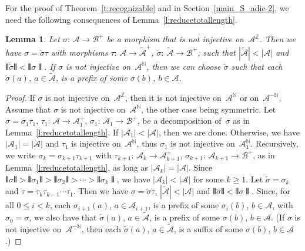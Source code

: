 \documentclass{amsart}
\newtheorem{lemma}{Lemma}[section]
\theoremstyle{definition}
\theoremstyle{remark}
\numberwithin{equation}{section}
\begin{document}
For the proof of Theorem~\ref{t:recognizable} and in Section~\ref{main_S_adic-2}, we need the following consequences of Lemma~\ref{l:reducetotallength}.

\begin{lemma} \label{l:reducealphabet}
Let $\sigma:\, \mathcal{A} \to \mathcal{B}^+$ be a morphism that is not injective on~$\mathcal{A}^\mathbb{Z}$.
Then we have $\sigma = \tilde{\sigma} \tau$ with morphisms $\tau:\, \mathcal{A} \to \tilde{\mathcal{A}}^+$, $\tilde{\sigma}:\, \tilde{\mathcal{A}} \to \mathcal{B}^+$, such that $|\tilde{\mathcal{A}}| < |\mathcal{A}|$ and $\interleave\tilde{\sigma}\interleave < \interleave\sigma\interleave$.
If $\sigma$ is not injective on~$\mathcal{A}^\mathbb{N}$, then we can choose $\tilde{\sigma}$ such that each $\tilde{\sigma}(a)$, $a \in \tilde{\mathcal{A}}$, is a prefix of some $\sigma(b)$, $b \in \mathcal{A}$. 
\end{lemma}

\begin{proof}
If $\sigma$ is not injective on~$\mathcal{A}^\mathbb{Z}$, then it is not injective on~$\mathcal{A}^\mathbb{N}$ or on~$\mathcal{A}^{-\mathbb{N}}$. 
Assume that $\sigma$ is not injective on~$\mathcal{A}^\mathbb{N}$, the other case being symmetric.
Let $\sigma = \sigma_1 \tau_1$, $\tau_1:\, \mathcal{A} \to \mathcal{A}_1^+$, $\sigma_1:\, \mathcal{A}_1 \to \mathcal{B}^+$, be a decomposition of~$\sigma$ as in Lemma~\ref{l:reducetotallength}.
If $|\mathcal{A}_1| < |\mathcal{A}|$, then we are done. 
Otherwise, we have $|\mathcal{A}_1| = |\mathcal{A}|$ and $\tau_1$ is injective on~$\mathcal{A}^\mathbb{N}$, thus $\sigma_1$ is not injective on~$\mathcal{A}_1^\mathbb{N}$.
Recursively, we write $\sigma_k = \sigma_{k+1} \tau_{k+1}$ with $\tau_{k+1}:\, \mathcal{A}_k \to \mathcal{A}_{k+1}^+$, $\sigma_{k+1}:\, \mathcal{A}_{k+1} \to \mathcal{B}^+$, as in Lemma~\ref{l:reducetotallength}, as long as $|\mathcal{A}_k| = |\mathcal{A}|$.
Since $\interleave\sigma\interleave > \interleave\sigma_1\interleave > \interleave\sigma_2\interleave > \cdots > \interleave\sigma_k\interleave$, we have $|\mathcal{A}_k| < |\mathcal{A}|$ for some $k \ge 1$. 
Let $\tilde{\sigma} = \sigma_k$ and $\tau =  \tau_k \tau_{k-1} \cdots \tau_1$.
Then we have $\sigma = \tilde{\sigma} \tau$, $|\tilde{\mathcal{A}}| < |\mathcal{A}|$ and $\interleave\tilde{\sigma}\interleave < \interleave\sigma\interleave$.
Since, for all $0 \le i < k$, each $\sigma_{i+1}(a)$, $a \in \mathcal{A}_{i+1}$, is a prefix of some $\sigma_i(b)$, $b \in \mathcal{A}$, with $\sigma_0 = \sigma$, we also have that $\tilde{\sigma}(a)$, $a \in \tilde{\mathcal{A}}$, is a prefix of some $\sigma(b)$, $b \in \mathcal{A}$. 
(If $\sigma$ is not injective on~$\mathcal{A}^{-\mathbb{N}}$, then each $\tilde{\sigma}(a)$, $a \in \tilde{\mathcal{A}}$, is a suffix of some $\sigma(b)$, $b \in \mathcal{A}$.)
\end{proof}
\end{document}
